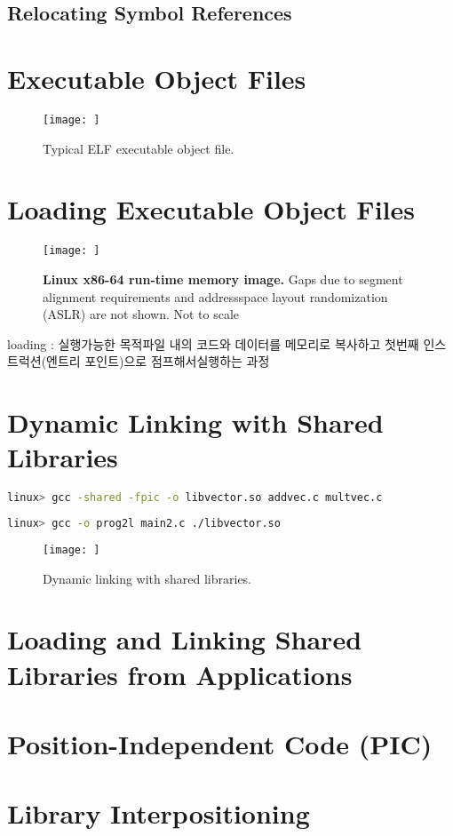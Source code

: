 \subsection{Relocating Symbol References}


\section{Executable Object Files}


\begin{figure}[h!]
    \centering
    \texttt{[image: ]}
    \caption{Typical ELF executable object file.}
\end{figure}

\section{Loading Executable Object Files}

\begin{figure}[h!]
    \centering
    \texttt{[image: ]}
    \caption{\textbf{Linux x86-64 run-time memory image.} 
    Gaps due to segment alignment requirements and addressspace layout randomization (ASLR) are not shown. Not to scale}
\end{figure}

loading : 실행가능한 목적파일 내의 코드와 데이터를 메모리로 복사하고 첫번째 인스트럭션(엔트리 포인트)으로 점프해서실행하는 과정

\section{Dynamic Linking with Shared Libraries}

\begin{lstlisting}[language=bash]
linux> gcc -shared -fpic -o libvector.so addvec.c multvec.c
\end{lstlisting}

\begin{lstlisting}[language=bash]
    linux> gcc -o prog2l main2.c ./libvector.so
\end{lstlisting}

\begin{figure}[h!]
    \centering
    \texttt{[image: ]}
    \caption{Dynamic linking with shared libraries.}
\end{figure}



\section{Loading and Linking Shared Libraries from Applications}

\section{Position-Independent Code (PIC)}

\section{Library Interpositioning}
